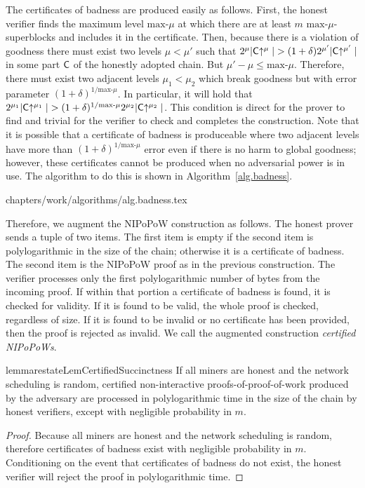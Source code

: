 The certificates of badness are produced easily as follows. First, the honest
verifier finds the maximum level $\text{max-}\mu$ at which there are at least
$m$ $\text{max-}\mu$-superblocks and includes it in the certificate. Then,
because there is a violation of goodness there must exist two levels $\mu <
\mu'$ such that $2^\mu|\mathsf{C}\negthickspace\uparrow^\mu| > (1 +
\delta)2^{\mu'}|\mathsf{C}\negthickspace\uparrow^{\mu'}|$ in some part $\mathsf{C}$ of the honestly
adopted chain. But $\mu' - \mu \leq \text{max-}\mu$. Therefore, there must exist
two adjacent levels $\mu_1 < \mu_2$ which break goodness but with error
parameter $(1 + \delta)^{1/{\text{max-}\mu}}$. In particular, it will hold that
$2^{\mu_1}|\mathsf{C}\negthickspace\uparrow^{\mu_1}| > (1 +
\delta)^{1/{\text{max-}\mu}}2^{\mu_2}|\mathsf{C}\negthickspace\uparrow^{\mu_2}|$. This condition
is direct for the prover to find and trivial for the verifier to check and
completes the construction. Note that it is possible that a certificate of
badness is produceable where two adjacent levels have more than $(1 +
\delta)^{1/{\text{max-}\mu}}$ error even if there is no harm to global goodness;
however, these certificates cannot be produced when no adversarial power is in
use. The algorithm to do this is shown in Algorithm~\ref{alg.badness}.

{chapters/work/algorithms/alg.badness.tex}

Therefore, we augment the NIPoPoW construction as follows. The honest prover
sends a tuple of two items. The first item is empty if the second item is
polylogarithmic in the size of the chain; otherwise it is a certificate of
badness. The second item is the NIPoPoW proof as in the previous construction.
The verifier processes only the first polylogarithmic number of bytes from the
incoming proof. If within that portion a certificate of badness is found, it is
checked for validity. If it is found to be valid, the whole proof is checked,
regardless of size. If it is found to be invalid or no certificate has been
provided, then the proof is rejected as invalid. We call the augmented
construction \emph{certified NIPoPoWs}.

\begin{restatable}{lemma}{restateLemCertifiedSuccinctness}
    \label{lem.certified-succinctness}
    If all miners are honest and the network scheduling is random,
    certified non-interactive proofs-of-proof-of-work produced by the adversary
    are processed in polylogarithmic time in the size of the chain by honest
    verifiers, except with negligible probability in $m$.
\end{restatable}
\begin{proof}
    Because all miners are honest and the network scheduling is random,
    therefore certificates of badness exist with negligible probability in $m$.
    Conditioning on the event that certificates of badness do not exist, the
    honest verifier will reject the proof in polylogarithmic time.
\end{proof}

